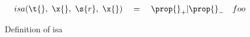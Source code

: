 \begin{figure*}
$$
\begin{array}{lclr}

\isacomparealign {\t{}} {\x{}} {\s{r}} {\x{}}
            {\filterset {\thenprop {\prop{}}}
                        {\elseprop {\prop{}}}} 
& foo
\end{array}
$$
\caption{Definition of isa}
\end{figure*}

